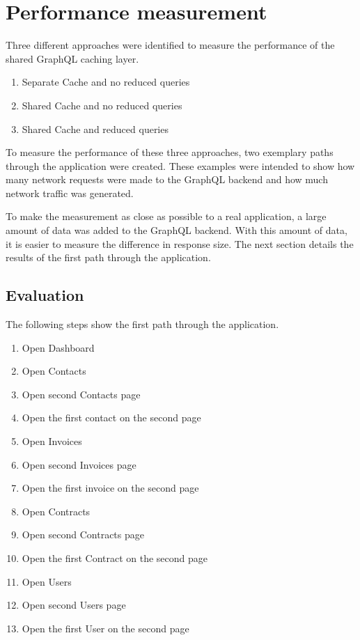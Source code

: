 \documentclass[MSE,Master,english]{twbook}%
\begin{document}
\section{Performance measurement}

Three different approaches were identified to measure the performance of the shared GraphQL caching layer.

\begin{enumerate}
    \item Separate Cache and no reduced queries
    \item Shared Cache and no reduced queries
    \item Shared Cache and reduced queries
\end{enumerate}

To measure the performance of these three approaches, two exemplary paths through the application were created. These examples were intended to show how many network requests were made to the GraphQL backend and how much network traffic was generated.

To make the measurement as close as possible to a real application, a large amount of data was added to the GraphQL backend. With this amount of data, it is easier to measure the difference in response size. The next section details the results of the first path through the application.

\subsection{Evaluation}

The following steps show the first path through the application. 

\begin{enumerate}
    \item Open Dashboard
    \item Open Contacts
    \item Open second Contacts page
    \item Open the first contact on the second page
    \item Open Invoices
    \item Open second Invoices page
    \item Open the first invoice on the second page
    \item Open Contracts
    \item Open second Contracts page
    \item Open the first Contract on the second page
    \item Open Users
    \item Open second Users page
    \item Open the first User on the second page
\end{enumerate}
\end{document}
